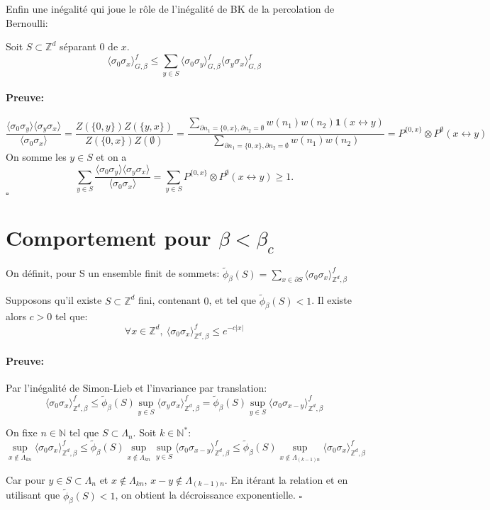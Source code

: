 \documentclass[a4paper,12pt]{report}
\newenvironment{preuve}{\paragraph{Preuve:}}{\hfill$\square$}
\begin{document}
Enfin une inégalité qui joue le rôle de l'inégalité de BK de la percolation de Bernoulli:

\begin{prop}
Soit $S\subset \mathbb{Z}^d$ séparant $0$ de $x$.
$$\langle \sigma_0 \sigma_x \rangle_{G,\beta}^f \leqslant \sum_{y\in S}\langle \sigma_0 \sigma_y\rangle_{G,\beta}^f \langle \sigma_y \sigma_x\rangle_{G,\beta}^f
$$
\end{prop}

\begin{preuve}
$$\frac{\langle \sigma_0 \sigma_y \rangle\langle\sigma_y \sigma_x\rangle}{\langle \sigma_0 \sigma_x\rangle} = \frac{Z(\{0,y\})Z(\{y,x\})}{Z(\{0,x\})Z(\emptyset)} = \frac{\sum_{\partial n_1=\{0,x\},\partial n_2= \emptyset} w(n_1)w(n_2)\mathbf{1}(x\leftrightarrow y)}{\sum_{\partial n_1 = \{0,x\},\partial n_2 = \emptyset}w(n_1)w(n_2)} = P^{\{0,x\}}\otimes P^\emptyset(x\leftrightarrow y)
$$
On somme les $y\in S$ et on a 
$$\sum_{y\in S}\frac{\langle \sigma_0 \sigma_y \rangle\langle\sigma_y \sigma_x\rangle}{\langle \sigma_0 \sigma_x\rangle} = \sum_{y\in S}P^{\{0,x\}}\otimes P^\emptyset(x\leftrightarrow y) \geqslant 1.
$$
\end{preuve}
\newpage

\section{Comportement pour $\beta < \beta_c$}

On définit, pour S un ensemble finit de sommets: $\tilde{\phi}_{\beta}(S) = \sum_{x \in \partial S} \langle \sigma_0 \sigma_x \rangle_{\mathbb{Z}^d,\beta}^f$

\begin{lemme}
Supposons qu'il existe $S \subset \mathbb{Z}^d$ fini, contenant $0$, et tel que $\tilde{\phi}_{\beta}(S)<1$. Il existe alors $c > 0$ tel que:
$$
\forall x \in \mathbb{Z}^d, \ \langle \sigma_0 \sigma_x \rangle_{\mathbb{Z}^d,\beta}^f \leq e^{-c\vert x \vert}
$$
\end{lemme}

\begin{preuve}
Par l'inégalité de Simon-Lieb et l'invariance par translation: 
$$\langle \sigma_0 \sigma_x \rangle_{\mathbb{Z}^d,\beta}^f 
\leq \tilde{\phi}_{\beta}(S) \sup_{y \in S} \langle \sigma_y \sigma_x \rangle_{\mathbb{Z}^d,\beta}^f 
= \tilde{\phi}_{\beta}(S) \sup_{y \in S} \langle \sigma_0 \sigma_{x-y} \rangle_{\mathbb{Z}^d,\beta}^f$$

On fixe $n \in \mathbb{N}$ tel que $S \subset \Lambda_n$. Soit $k \in \mathbb{N}^*$:
$$
\sup_{x \notin \Lambda_{kn}} \langle \sigma_0 \sigma_x \rangle_{\mathbb{Z}^d,\beta}^f 
\leq \tilde{\phi}_{\beta}(S) \sup_{x \notin \Lambda_{kn}} \sup_{y \in S} \langle \sigma_0 \sigma_{x-y} \rangle_{\mathbb{Z}^d,\beta}^f
\leq \tilde{\phi}_{\beta}(S) \sup_{x \notin \Lambda_{(k-1)n}} \langle \sigma_0 \sigma_{x} \rangle_{\mathbb{Z}^d,\beta}^f$$

Car pour $y \in S \subset \Lambda_n$ et $x \notin \Lambda_{kn}$, $x-y \notin \Lambda_{(k-1)n}$. En itérant la relation et en utilisant que $\tilde{\phi}_{\beta}(S)<1$, on obtient la décroissance exponentielle.
\end{preuve}
\end{document}
